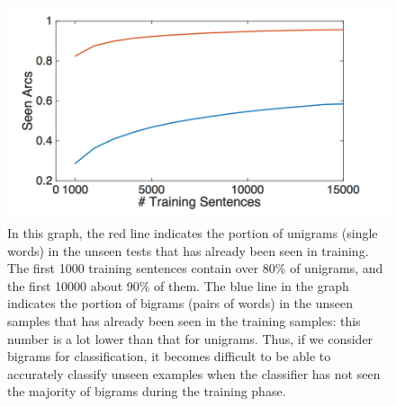\documentclass[justified, marginals=justified]{tufte-handout}
\begin{document}
\begin{figure}
  \includegraphics[width=\linewidth]{sparsity.png}
  \caption{In this graph, the red line indicates the portion of unigrams (single words) in the unseen tests that has already been seen in training. The first 1000 training sentences contain over 80\% of unigrams, and the first 10000 about 90\% of them. The blue line in the graph indicates the portion of bigrams (pairs of words) in the unseen samples that has already been seen in the training samples: this number is a lot lower than that for unigrams. Thus, if we consider bigrams for classification, it becomes difficult to be able to accurately classify unseen examples when the classifier has not seen the majority of bigrams during the training phase.} %
  \label{fig:sparsity}
  \centering
\end{figure}
\vspace{55pt}
\end{document}
